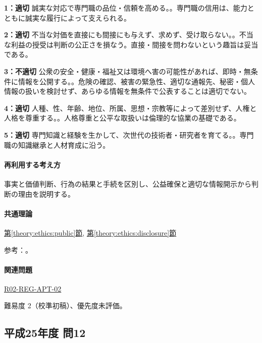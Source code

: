 \noindent\textbf{1：適切} 誠実な対応で専門職の品位・信頼を高める。。専門職の信用は、能力とともに誠実な履行によって支えられる。\par

\noindent\textbf{2：適切} 不当な対価を直接にも間接にも与えず、求めず、受け取らない。。不当な利益の授受は判断の公正さを損なう。直接・間接を問わないという趣旨は妥当である。\par

\noindent\textbf{3：不適切} 公衆の安全・健康・福祉又は環境へ害の可能性があれば、即時・無条件に情報を公開する。。危険の確認、被害の緊急性、適切な通報先、秘密・個人情報の扱いを検討せず、あらゆる情報を無条件で公表することは適切でない。\par

\noindent\textbf{4：適切} 人種、性、年齢、地位、所属、思想・宗教等によって差別せず、人権と人格を尊重する。。人格尊重と公平な取扱いは倫理的な協業の基礎である。\par

\noindent\textbf{5：適切} 専門知識と経験を生かして、次世代の技術者・研究者を育てる。。専門職の知識継承と人材育成に沿う。\par

\paragraph{再利用する考え方} 事実と価値判断、行為の結果と手続を区別し、公益確保と適切な情報開示から判断の理由を説明する。

\paragraph{共通理論} \hyperref[theory:ethics:public]{第\ref*{theory:ethics:public}節}, \hyperref[theory:ethics:disclosure]{第\ref*{theory:ethics:disclosure}節}

\par 参考：\cite{ipej_ethics2011,ipej_ethics2023}。

\paragraph{関連問題} \hyperref[q:r02-reg-apt-02]{R02-REG-APT-02}

\par 難易度 2（校準初稿）、優先度未評価。

\subsection{平成25年度 問12}
\label{q:h25-reg-apt-12}

